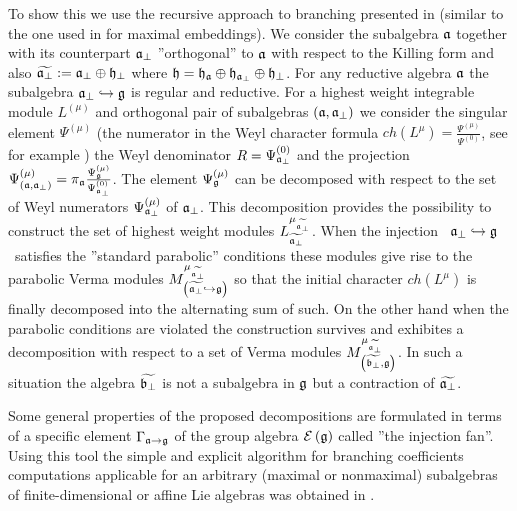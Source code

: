 \documentclass[12pt]{article}
\theoremstyle{definition}
\begin{document}
To show this we use the recursive approach to branching presented in \cite{2010arXiv1007.0318L} (similar to the one used in \cite{ilyin812pbc} for maximal
embeddings). We consider the subalgebra $\frak{a}$ together with its
counterpart $\frak{a}_{\bot }$ ''orthogonal'' to $\frak{a}$ with respect to
the Killing form and also $\widetilde{\frak{a}_{\perp }}:=\frak{a}_{\perp
}\oplus \frak{h}_{\perp }$ where $\frak{h}=\frak{\frak{h}_{\frak{a}}}\oplus 
\frak{h}_{\frak{a}_{\perp }}\oplus \frak{h}_{\perp }$. For any reductive
algebra $\frak{a}$ the subalgebra $\frak{a}_{\bot }\hookrightarrow \frak{g}$
is regular and reductive. For a highest weight integrable module $L^{\left(
\mu \right) }$ and orthogonal pair of subalgebras $\left( \frak{a},\frak{a}%
_{\bot }\right) $ we consider the singular element $\Psi ^{\left( \mu
\right) }$ (the numerator in the Weyl character formula $ch\left( L^{\mu
}\right) =\frac{\Psi ^{\left( \mu \right) }}{\Psi ^{\left( 0\right) }}$, see
for example \cite{humphreys1997introduction}) the Weyl denominator $R=\Psi _{%
\frak{a}_{\bot }}^{\left( 0\right) }$ and the projection $\Psi _{\left( 
\frak{a},\frak{a}_{\bot }\right) }^{\left( \mu \right) }=\pi _{\frak{a}}%
\frac{\Psi _{\frak{g}}^{\left( \mu \right) }}{\Psi _{\frak{a}_{\bot
}}^{\left( 0\right) }}$. The element $\Psi _{\frak{g}}^{\left( \mu \right) }$
can be decomposed with respect to the set of Weyl numerators $\Psi _{\frak{a}%
_{\bot }}^{\left( \mu \right) }$ of $\frak{a}_{\bot }$. This decomposition
provides the possibility to construct the set of highest weight modules $L_{%
\widetilde{\frak{a}_{\perp }}}^{\mu _{\widetilde{\frak{a}_{\perp }}}}$. When
the injection \ $\frak{a}_{\bot }\hookrightarrow \frak{g}$ \ satisfies the
''standard parabolic'' conditions these modules give rise to the parabolic
Verma modules $M_{\left( \widetilde{\frak{a}_{\perp }}\hookrightarrow \frak{g%
}\right) }^{\mu _{\widetilde{\frak{a}_{\perp }}}}$ so that the initial
character $ch\left( L^{\mu }\right) $ is finally decomposed into the
alternating sum of such. On the other hand when the parabolic conditions are
violated the construction survives and exhibites a decomposition with
respect to a set of Verma modules $M_{\left( \widetilde{\frak{b}_{\perp }},%
\frak{g}\right) }^{\mu _{\widetilde{\frak{a}_{\perp }}}}$. In such a
situation the algebra $\widetilde{\frak{b}_{\perp }}$ is not a subalgebra in 
$\frak{g}$ but a contraction of $\widetilde{\frak{a}_{\perp }}$.

Some general properties of the proposed decompositions are formulated in
terms of a specific element $\Gamma _{\frak{a}\rightarrow \frak{g}}$ of the
group algebra $\mathcal{E}\left( \frak{g}\right) $ called ''the injection
fan''. Using this tool the simple and explicit algorithm for branching
coefficients computations applicable for an arbitrary (maximal or
nonmaximal) subalgebras of finite-dimensional or affine Lie algebras was
obtained in \cite{2010arXiv1007.0318L}.
\end{document}
